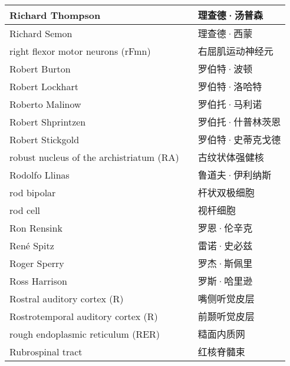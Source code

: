 \begin{longtable}{lll}
	\midrule
	Richard Thompson   && 理查德·汤普森  \\
	
	\midrule
	Richard Semon   && 理查德·西蒙  \\
	
	\midrule
	right flexor motor neurons (rFmn)   && 右屈肌运动神经元  \\
	
	\midrule
	Robert Burton   && 罗伯特·波顿  \\
	
	\midrule
	Robert Lockhart   && 罗伯特·洛哈特  \\
	
	\midrule
	Roberto Malinow   && 罗伯托·马利诺  \\
	
	\midrule
	Robert Shprintzen   && 罗伯托·什普林茨恩  \\
	
	\midrule
	Robert Stickgold   && 罗伯特·史蒂克戈德  \\
	
	\midrule
	robust nucleus of the archistriatum (RA)   && 古纹状体强健核  \\
	
	\midrule
	Rodolfo Llinas   && 鲁道夫·伊利纳斯  \\
	
	\midrule
	rod bipolar   && 杆状双极细胞  \\
	
	\midrule
	rod cell   && 视杆细胞  \\
	
	\midrule
	Ron Rensink   && 罗恩·伦辛克  \\
	
	\midrule
	René Spitz   && 雷诺·史必兹  \\
	
	\midrule
	Roger Sperry   && 罗杰·斯佩里  \\
	
	\midrule
	Ross Harrison   && 罗斯·哈里逊  \\
	
	\midrule
	Rostral auditory cortex (R)   && 嘴侧听觉皮层  \\
	
	\midrule
	Rostrotemporal auditory cortex (R)   && 前颞听觉皮层 \\
	
	\midrule
	rough endoplasmic reticulum (RER)   && 糙面内质网 \\
	
	\midrule
	Rubrospinal tract   && 红核脊髓束 \\
	

\end{longtable}
